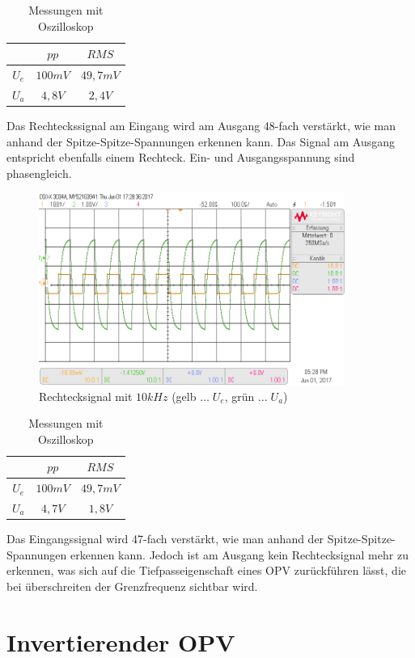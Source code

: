 \documentclass[12pt,a4paper,titlepage]{article}
\begin{document}
\begin{table}[H]
  \centering
  \begin{tabular}{c|c|c}
     & $pp$ & $RMS$ \\
     \hline
    $U_{e}$ & $100mV$ & $49,7mV$ \\
    \hline
    $U_{a}$ & $4,8V$ & $2,4V$
  \end{tabular}
  \caption{Messungen mit Oszilloskop}
\end{table}

\noindent Das Rechteckssignal am Eingang wird am Ausgang 48-fach verstärkt, wie man anhand der Spitze-Spitze-Spannungen erkennen kann. Das Signal am Ausgang entspricht ebenfalls einem Rechteck. Ein- und Ausgangsspannung sind phasengleich.

\begin{figure}[H]
  \centering
  \includegraphics[width=100mm]{scope_3.png}
  \caption{Rechtecksignal mit $10kHz$ (gelb $\hdots\;U_e$, grün $\hdots\;U_a$)}
\end{figure}

\begin{table}[H]
  \centering
  \begin{tabular}{c|c|c}
     & $pp$ & $RMS$ \\
     \hline
    $U_{e}$ & $100mV$ & $49,7mV$ \\
    \hline
    $U_{a}$ & $4,7V$ & $1,8V$
  \end{tabular}
  \caption{Messungen mit Oszilloskop}
\end{table}

\noindent Das Eingangssignal wird 47-fach verstärkt, wie man anhand der Spitze-Spitze-Spannungen erkennen kann. Jedoch ist am Ausgang kein Rechtecksignal mehr zu erkennen, was sich auf die Tiefpasseigenschaft eines OPV zurückführen lässt, die bei überschreiten der Grenzfrequenz sichtbar wird.

\section{Invertierender OPV}
\end{document}

